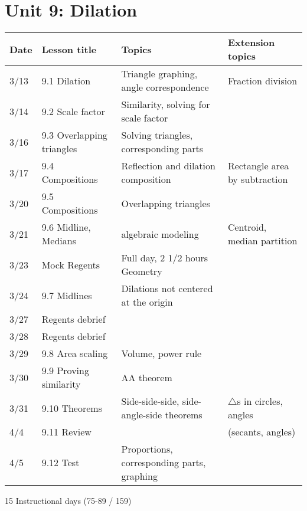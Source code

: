 \documentclass[12pt, twoside]{article}
\begin{document}
\section*{Unit 9: Dilation}
\begin{tabular}{|p{0.9cm}|p{4cm}|p{7cm}|p{5cm}|}
  \hline
  Date & Lesson title & Topics  & Extension topics \\
  \hline
  3/13 & 9.1 Dilation & Triangle graphing, angle correspondence & Fraction division \\
  \hline
  3/14 & 9.2 Scale factor & Similarity, solving for scale factor &  \\
  \hline
  3/16 & 9.3 Overlapping triangles & Solving triangles, corresponding parts &  \\
  \hline
  3/17 & 9.4 Compositions & Reflection and dilation composition & Rectangle area by subtraction \\
  \hline
  3/20 & 9.5 Compositions & Overlapping triangles &  \\
  \hline
  3/21 & 9.6 Midline, Medians & algebraic modeling & Centroid, median partition \\
  \hline
  3/23 & Mock Regents & Full day, 2 1/2 hours Geometry &  \\
  \hline
  3/24 & 9.7 Midlines & Dilations not centered at the origin &  \\
  \hline
  3/27 & Regents debrief &  &  \\
  \hline
  3/28 & Regents debrief  &  &  \\
  \hline
  3/29 & 9.8 Area scaling & Volume, power rule &  \\
  \hline
  3/30 & 9.9 Proving similarity & AA theorem &  \\
  \hline
  3/31 & 9.10 Theorems & Side-side-side, side-angle-side theorems & $\triangle$s in circles, angles \\
  \hline
  4/4 & 9.11 Review &  & (secants, angles) \\
  \hline
  4/5 & 9.12 Test & Proportions, corresponding parts, graphing &  \\
  \hline

\end{tabular} \par \vspace*{0.3cm}
15 Instructional days (75-89 / 159)
\end{document}
